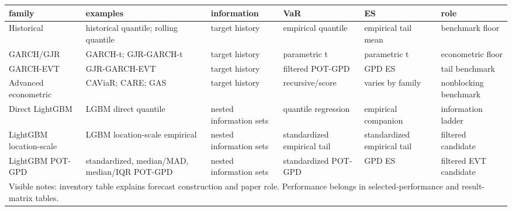 \begin{tabular}{llllll}
\toprule
family & examples & information & VaR & ES & role \\
\midrule
Historical & historical quantile; rolling quantile & target history & empirical quantile & empirical tail mean & benchmark floor \\
GARCH/GJR & GARCH-t; GJR-GARCH-t & target history & parametric t & parametric t & econometric floor \\
GARCH-EVT & GJR-GARCH-EVT & target history & filtered POT-GPD & GPD ES & tail benchmark \\
Advanced econometric & CAViaR; CARE; GAS & target history & recursive/score & varies by family & nonblocking benchmark \\
Direct LightGBM & LGBM direct quantile & nested information sets & quantile regression & empirical companion & information ladder \\
LightGBM location-scale & LGBM location-scale empirical & nested information sets & standardized empirical tail & standardized empirical tail & filtered candidate \\
LightGBM POT-GPD & standardized, median/MAD, median/IQR POT-GPD & nested information sets & standardized POT-GPD & GPD ES & filtered EVT candidate \\
\midrule
\multicolumn{6}{l}{\footnotesize Visible notes: inventory table explains forecast construction and paper role. Performance belongs in selected-performance and result-matrix tables.} \\
\bottomrule
\end{tabular}
